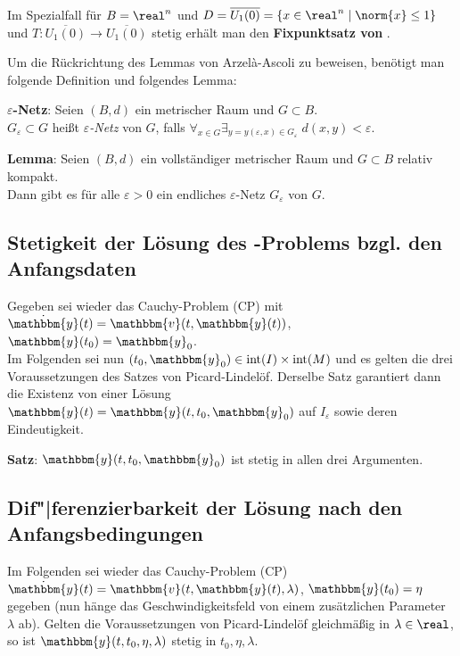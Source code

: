Im Spezialfall für $B = \real^n$ und
$D = \overline{U_1(0)} = \{x \in \real^n \;|\; \norm{x} \le 1\}$
und $T\colon \overline{U_1(0)} \rightarrow \overline{U_1(0)}$ stetig
erhält man den \textbf{Fixpunktsatz von }.

\linie

Um die Rückrichtung des Lemmas von Arzelà-Ascoli zu beweisen, benötigt man
folgende Definition und folgendes Lemma:

\textbf{$\varepsilon$-Netz}:
Seien $(B, d)$ ein metrischer Raum und $G \subset B$. \\
$G_\varepsilon \subset G$ heißt \emph{$\varepsilon$-Netz} von $G$, falls
$\forall_{x \in G} \exists_{y = y(\varepsilon, x) \in G_\varepsilon}\;
d(x, y) < \varepsilon$.

\textbf{Lemma}:
Seien $(B, d)$ ein vollständiger metrischer Raum und $G \subset B$
relativ kompakt. \\
Dann gibt es für alle $\varepsilon > 0$ ein endliches $\varepsilon$-Netz
$G_\varepsilon$ von $G$.

\pagebreak

\subsection{%
    Stetigkeit der Lösung des -Problems bzgl. den Anfangsdaten%
}

Gegeben sei wieder das Cauchy-Problem (CP) mit
$\dot{\mathbbm{y}}(t) = \mathbbm{v}(t, \mathbbm{y}(t))$,
$\mathbbm{y}(t_0) = \mathbbm{y}_0$. \\
Im Folgenden sei nun $(t_0, \mathbbm{y}_0) \in \inneres(I) \times \inneres(M)$
und es gelten die drei Voraussetzungen des Satzes von Picard-Lindelöf.
Derselbe Satz garantiert dann die Existenz von einer Lösung \\
$\mathbbm{y}(t) = \mathbbm{y}(t, t_0, \mathbbm{y}_0)$ auf $I_\varepsilon$
sowie deren Eindeutigkeit.

\textbf{Satz}:
$\mathbbm{y}(t, t_0, \mathbbm{y}_0)$ ist stetig in allen drei Argumenten.

\subsection{%
    Dif"|ferenzierbarkeit der Lösung nach den Anfangsbedingungen%
}

Im Folgenden sei wieder das Cauchy-Problem (CP)
$\dot{\mathbbm{y}}(t) = \mathbbm{v}(t, \mathbbm{y}(t), \lambda)$,
$\mathbbm{y}(t_0) = \eta$
gegeben (nun hänge das Geschwindigkeitsfeld von einem zusätzlichen Parameter
$\lambda$ ab).
Gelten die Voraussetzungen von Picard-Lindelöf gleichmäßig in
$\lambda \in \real$, so ist $\mathbbm{y}(t, t_0, \eta, \lambda)$ stetig
in $t_0, \eta, \lambda$.


